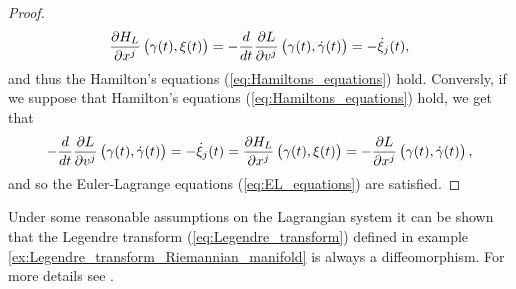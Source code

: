 \begin{proof}
\begin{equation*}
		\frac{\partial H_L}{\partial x^j}\del[1]{\gamma(t),\xi(t)} = -\frac{d}{dt}\frac{\partial L}{\partial v^j}\del[1]{\gamma(t),\dot{\gamma}(t)} = -\dot{\xi}_j(t),
	\end{equation*}
	\noindent and thus the Hamilton's equations (\ref{eq:Hamiltons_equations}) hold. Conversly, if we suppose that Hamilton's equations (\ref{eq:Hamiltons_equations}) hold, we get that
	\begin{equation*}
		-\frac{d}{dt}\frac{\partial L}{\partial v^j}\del[1]{\gamma(t),\dot{\gamma}(t)} = -\dot{\xi}_j(t) = \frac{\partial H_L}{\partial x^j}\del[1]{\gamma(t),\xi(t)} = -\frac{\partial L}{\partial x^j}\del[1]{\gamma(t),\dot{\gamma}(t)},
	\end{equation*}
	\noindent and so the Euler-Lagrange equations (\ref{eq:EL_equations}) are satisfied.
\end{proof}

\begin{remark}
	Under some reasonable assumptions on the Lagrangian system it can be shown that the Legendre transform (\ref{eq:Legendre_transform}) defined in example \ref{ex:Legendre_transform_Riemannian_manifold} is always a diffeomorphism. For more details see \cite[8]{mazzucchelli:CPT:2012}.	
\end{remark}
